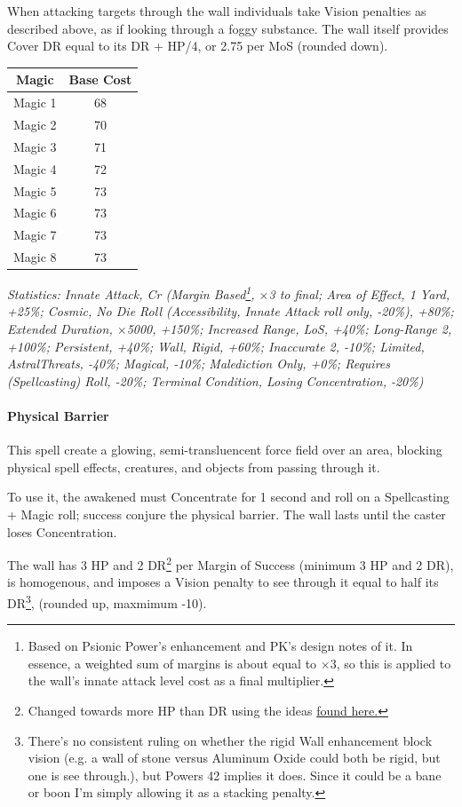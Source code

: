 \begin{multicols*}{3}
	When attacking targets through the wall individuals take Vision penalties as described above, as if looking through a foggy substance. The wall itself provides Cover DR equal to its DR + HP/4, or 2.75 per MoS (rounded down).
	
	\begin{center}
		\begin{tabular}{|c|c|}
			\hline
			Magic & Base Cost \\
			\hline
			\hline
			Magic 1 & 68 \\
			Magic 2 & 70 \\
			Magic 3 & 71 \\
			Magic 4 & 72 \\
			Magic 5 & 73 \\
			Magic 6 & 73 \\
			Magic 7 & 73 \\
			Magic 8 & 73 \\
			\hline
		\end{tabular}
	\end{center}
	
	\textcolor{OliveGreen}{\textit{Statistics: Innate Attack, Cr (Margin Based\footnote{Based on Psionic Power's enhancement and PK's design notes of it. In essence, a weighted sum of margins is about equal to $\times$3, so this is applied to the wall's innate attack level cost as a final multiplier.}, $\times$3 to final; Area of Effect, 1 Yard, +25\%; Cosmic, No Die Roll (Accessibility, Innate Attack roll only, -20\%), +80\%; Extended Duration, $\times$5000, +150\%; Increased Range, LoS, +40\%; Long-Range 2, +100\%; Persistent, +40\%; Wall, Rigid, +60\%; Inaccurate 2, -10\%; Limited, AstralThreats, -40\%; Magical, -10\%; Malediction Only, +0\%; Requires (Spellcasting) Roll, -20\%; Terminal Condition, Losing Concentration, -20\%)}}
	
	\paragraph{Physical Barrier}
	
	This spell create a glowing, semi-transluencent force field over an area, blocking physical spell effects, creatures, and objects from passing through it.
	
	To use it, the awakened must Concentrate for 1 second and roll on a Spellcasting + Magic roll; success conjure the physical barrier. The wall lasts until the caster loses Concentration.
	
	The wall has 3 HP and 2 DR\footnote{Changed towards more HP than DR using the ideas \textcolor{Blue}{\href{http://forums.sjgames.com/showpost.php?p=2050064&postcount=3}{found here.}}} per Margin of Success (minimum 3 HP and 2 DR), is homogenous, and imposes a Vision penalty to see through it equal to half its DR\footnote{There's no consistent ruling on whether the rigid Wall enhancement block vision (e.g. a wall of stone versus Aluminum Oxide could both be rigid, but one is see through.), but Powers 42 implies it does. Since it could be a bane or boon I'm simply allowing it as a stacking penalty.}, (rounded up, maxmimum -10).
		

\end{multicols*}
